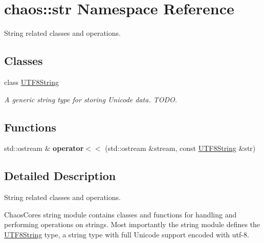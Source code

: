 \hypertarget{namespacechaos_1_1str}{}\section{chaos\+:\+:str Namespace Reference}
\label{namespacechaos_1_1str}


String related classes and operations.  


\subsection*{Classes}
\begin{DoxyCompactItemize}
\item 
class \hyperlink{classchaos_1_1str_1_1_u_t_f8_string}{U\+T\+F8\+String}
\begin{DoxyCompactList}\small\item\em A generic string type for storing Unicode data. T\+O\+D\+O. \end{DoxyCompactList}\end{DoxyCompactItemize}
\subsection*{Functions}
\begin{DoxyCompactItemize}
\item 
\hypertarget{namespacechaos_1_1str_af8ed01c19bc2b322f36a751694e2dd0c}{}std\+::ostream \& {\bfseries operator$<$$<$} (std\+::ostream \&stream, const \hyperlink{classchaos_1_1str_1_1_u_t_f8_string}{U\+T\+F8\+String} \&str)\label{namespacechaos_1_1str_af8ed01c19bc2b322f36a751694e2dd0c}

\end{DoxyCompactItemize}


\subsection{Detailed Description}
String related classes and operations. 

Chaos\+Core\textquotesingle{}s string module contains classes and functions for handling and performing operations on strings. Most importantly the string module defines the \hyperlink{classchaos_1_1str_1_1_u_t_f8_string}{U\+T\+F8\+String} type, a string type with full Unicode support encoded with utf-\/8. 
